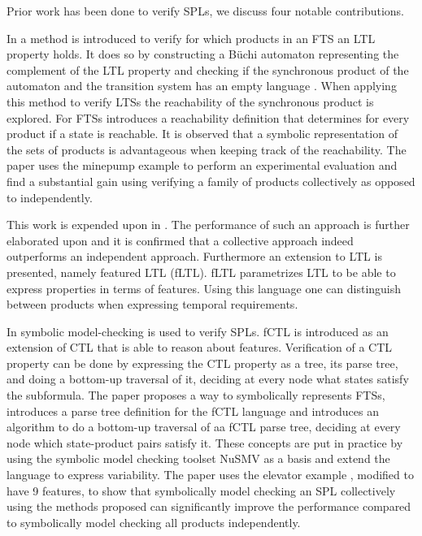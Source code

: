 Prior work has been done to verify SPLs, we discuss four notable contributions.

In \cite{CheckingLotsOfSystems} a method is introduced to verify for which products in an FTS an LTL property holds. It does so by constructing a B{\"u}chi automaton representing the complement of the LTL property and checking if the synchronous product of the automaton and the transition system has an empty language \cite{LTLusingAutomata}. When applying this method to verify LTSs the reachability of the synchronous product is explored. For FTSs \cite{CheckingLotsOfSystems} introduces a reachability definition that determines for every product if a state is reachable. It is observed that a symbolic representation of the sets of products is advantageous when keeping track of the reachability. The paper uses the minepump example \cite{Kramer1983CONICAI} to perform an experimental evaluation and find a substantial gain using verifying a family of products collectively as opposed to independently.

This work is expended upon in \cite{FTSLTL}. The performance of such an approach is further elaborated upon and it is confirmed that a collective approach indeed outperforms an independent approach. Furthermore an extension to LTL is presented, namely featured LTL (fLTL). fLTL parametrizes LTL to be able to express properties in terms of features. Using this language one can distinguish between products when expressing temporal requirements.

In \cite{FTSCTL} symbolic model-checking is used to verify SPLs. fCTL is introduced as an extension of CTL that is able to reason about features. Verification of a CTL property can be done by expressing the CTL property as a tree, its parse tree, and doing a bottom-up traversal of it, deciding at every node what states satisfy the subformula. The paper proposes a way to symbolically represents FTSs, introduces a parse tree definition for the fCTL language and introduces an algorithm to do a bottom-up traversal of aa fCTL parse tree, deciding at every node which state-product pairs satisfy it. These concepts are put in practice by using the symbolic model checking toolset NuSMV \cite{NuSMV} as a basis and extend the language to express variability. The paper uses the elevator example \cite{PLATH200153}, modified to have 9 features, to show that symbolically model checking an SPL collectively using the methods proposed can significantly improve the performance compared to symbolically model checking all products independently.

